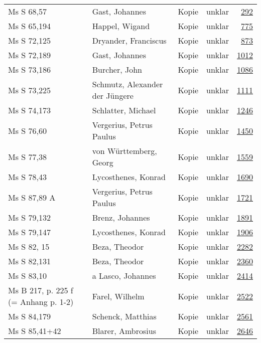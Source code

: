 \documentclass[10pt,a4paper,landscape]{report}
\begin{document}
\begin{longtable}{p{16cm}p{4cm}llr}
Ms S 68,57	&	Gast, Johannes	&	Kopie	&	unklar	&	\href{http://130.60.24.72/assignment/292}{292}\\
Ms S 65,194	&	Happel, Wigand	&	Kopie	&	unklar	&	\href{http://130.60.24.72/assignment/775}{775}\\
Ms S 72,125	&	Dryander, Franciscus	&	Kopie	&	unklar	&	\href{http://130.60.24.72/assignment/873}{873}\\
Ms S 72,189	&	Gast, Johannes	&	Kopie	&	unklar	&	\href{http://130.60.24.72/assignment/1012}{1012}\\
Ms S 73,186	&	Burcher, John	&	Kopie	&	unklar	&	\href{http://130.60.24.72/assignment/1086}{1086}\\
Ms S 73,225	&	Schmutz, Alexander der Jüngere	&	Kopie	&	unklar	&	\href{http://130.60.24.72/assignment/1111}{1111}\\
Ms S 74,173	&	Schlatter, Michael	&	Kopie	&	unklar	&	\href{http://130.60.24.72/assignment/1246}{1246}\\
Ms S 76,60	&	Vergerius, Petrus Paulus	&	Kopie	&	unklar	&	\href{http://130.60.24.72/assignment/1450}{1450}\\
Ms S 77,38	&	von Württemberg, Georg	&	Kopie	&	unklar	&	\href{http://130.60.24.72/assignment/1559}{1559}\\
Ms S 78,43	&	Lycosthenes, Konrad	&	Kopie	&	unklar	&	\href{http://130.60.24.72/assignment/1690}{1690}\\
Ms S 87,89 A	&	Vergerius, Petrus Paulus	&	Kopie	&	unklar	&	\href{http://130.60.24.72/assignment/1721}{1721}\\
Ms S 79,132	&	Brenz, Johannes	&	Kopie	&	unklar	&	\href{http://130.60.24.72/assignment/1891}{1891}\\
Ms S 79,147	&	Lycosthenes, Konrad	&	Kopie	&	unklar	&	\href{http://130.60.24.72/assignment/1906}{1906}\\
Ms S 82, 15	&	Beza, Theodor	&	Kopie	&	unklar	&	\href{http://130.60.24.72/assignment/2282}{2282}\\
Ms S 82,131	&	Beza, Theodor	&	Kopie	&	unklar	&	\href{http://130.60.24.72/assignment/2360}{2360}\\
Ms S 83,10	&	a Lasco, Johannes	&	Kopie	&	unklar	&	\href{http://130.60.24.72/assignment/2414}{2414}\\
Ms B 217, p. 225 f (= Anhang p. 1-2)	&	Farel, Wilhelm	&	Kopie	&	unklar	&	\href{http://130.60.24.72/assignment/2522}{2522}\\
Ms S 84,179	&	Schenck, Matthias	&	Kopie	&	unklar	&	\href{http://130.60.24.72/assignment/2561}{2561}\\
Ms S 85,41+42	&	Blarer, Ambrosius	&	Kopie	&	unklar	&	\href{http://130.60.24.72/assignment/2646}{2646}\\

\end{longtable}
\end{document}
